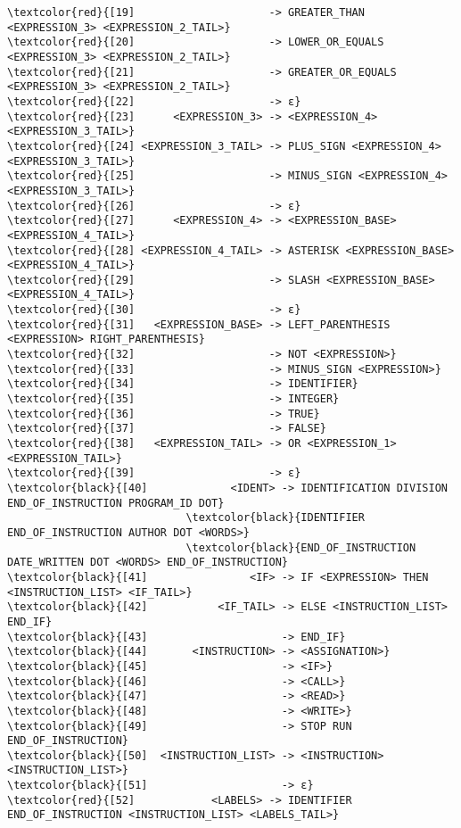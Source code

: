 \begin{Verbatim}[commandchars=\\\{\}]
\textcolor{red}{[19]                     -> GREATER_THAN <EXPRESSION_3> <EXPRESSION_2_TAIL>}
\textcolor{red}{[20]                     -> LOWER_OR_EQUALS <EXPRESSION_3> <EXPRESSION_2_TAIL>}
\textcolor{red}{[21]                     -> GREATER_OR_EQUALS <EXPRESSION_3> <EXPRESSION_2_TAIL>}
\textcolor{red}{[22]                     -> ε}
\textcolor{red}{[23]      <EXPRESSION_3> -> <EXPRESSION_4> <EXPRESSION_3_TAIL>}
\textcolor{red}{[24] <EXPRESSION_3_TAIL> -> PLUS_SIGN <EXPRESSION_4> <EXPRESSION_3_TAIL>}
\textcolor{red}{[25]                     -> MINUS_SIGN <EXPRESSION_4> <EXPRESSION_3_TAIL>}
\textcolor{red}{[26]                     -> ε}
\textcolor{red}{[27]      <EXPRESSION_4> -> <EXPRESSION_BASE> <EXPRESSION_4_TAIL>}
\textcolor{red}{[28] <EXPRESSION_4_TAIL> -> ASTERISK <EXPRESSION_BASE> <EXPRESSION_4_TAIL>}
\textcolor{red}{[29]                     -> SLASH <EXPRESSION_BASE> <EXPRESSION_4_TAIL>}
\textcolor{red}{[30]                     -> ε}
\textcolor{red}{[31]   <EXPRESSION_BASE> -> LEFT_PARENTHESIS <EXPRESSION> RIGHT_PARENTHESIS}
\textcolor{red}{[32]                     -> NOT <EXPRESSION>}
\textcolor{red}{[33]                     -> MINUS_SIGN <EXPRESSION>}
\textcolor{red}{[34]                     -> IDENTIFIER}
\textcolor{red}{[35]                     -> INTEGER}
\textcolor{red}{[36]                     -> TRUE}
\textcolor{red}{[37]                     -> FALSE}
\textcolor{red}{[38]   <EXPRESSION_TAIL> -> OR <EXPRESSION_1> <EXPRESSION_TAIL>}
\textcolor{red}{[39]                     -> ε}
\textcolor{black}{[40]             <IDENT> -> IDENTIFICATION DIVISION END_OF_INSTRUCTION PROGRAM_ID DOT}
                            \textcolor{black}{IDENTIFIER END_OF_INSTRUCTION AUTHOR DOT <WORDS>}
                            \textcolor{black}{END_OF_INSTRUCTION DATE_WRITTEN DOT <WORDS> END_OF_INSTRUCTION}
\textcolor{black}{[41]                <IF> -> IF <EXPRESSION> THEN <INSTRUCTION_LIST> <IF_TAIL>}
\textcolor{black}{[42]           <IF_TAIL> -> ELSE <INSTRUCTION_LIST> END_IF}
\textcolor{black}{[43]                     -> END_IF}
\textcolor{black}{[44]       <INSTRUCTION> -> <ASSIGNATION>}
\textcolor{black}{[45]                     -> <IF>}
\textcolor{black}{[46]                     -> <CALL>}
\textcolor{black}{[47]                     -> <READ>}
\textcolor{black}{[48]                     -> <WRITE>}
\textcolor{black}{[49]                     -> STOP RUN END_OF_INSTRUCTION}
\textcolor{black}{[50]  <INSTRUCTION_LIST> -> <INSTRUCTION> <INSTRUCTION_LIST>}
\textcolor{black}{[51]                     -> ε}
\textcolor{red}{[52]            <LABELS> -> IDENTIFIER END_OF_INSTRUCTION <INSTRUCTION_LIST> <LABELS_TAIL>}

\end{Verbatim}
